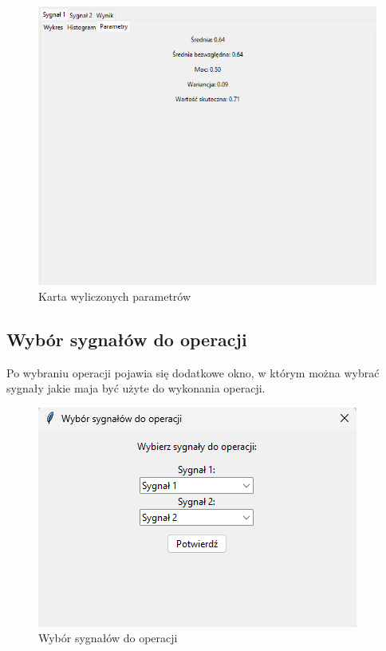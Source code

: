 \documentclass{article}
\begin{document}
\begin{figure}[h!]
    \centering
    \includegraphics[width=\textwidth]{img/param.png}
    \caption{Karta wyliczonych parametrów}
\end{figure}
\FloatBarrier
\subsection{Wybór sygnałów do operacji} 


Po wybraniu operacji pojawia się dodatkowe okno, w którym można 
wybrać sygnały jakie maja być użyte do wykonania operacji.
\FloatBarrier
\begin{figure}[h!]
    \centering
    \includegraphics[width=\textwidth]{img/wybor.png}
    \caption{Wybór sygnałów do operacji}
\end{figure}
\end{document}
